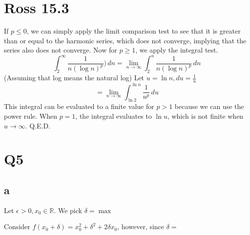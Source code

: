 \documentclass[12pt]{article}
\newcommand{\R}{\mathbb{R}}
\begin{document}
\section{Ross 15.3}
If $p\leq0$, we can simply apply the limit comparison test to see that it is greater than or equal to the harmonic series, which does not converge, implying that the series also does not converge.
\newline
Now for $p \geq 1$, we apply the integral test.
$$\int_{2}^{\infty}\frac{1}{n(\log n)^p}) \,dn = \lim _{n \to \infty} \int_{2}^{n}\frac{1}{n(\log n)^p} \,dn$$
(Assuming that log means the natural log) Let $u = \ln n, du = \frac{1}{n}$
$$= \lim _{n \to \infty} \int_{\ln 2}^{\ln n} \frac{1}{u^p} \,du$$
This integral can be evaluated to a finite value for $p>1$ because we can use the power rule. When $p = 1$, the integral evaluates to $\ln u$, which is not finite when $u \to \infty$.
\newline
Q.E.D.
\newpage


\section{Q5}
\subsection{a}
Let $\epsilon > 0, x_0 \in \R$. We pick $\delta = \max$

Consider $f(x_0+\delta) = x_0^2+\delta^2+2\delta x_0$, however, since $\delta = $
\end{document}
